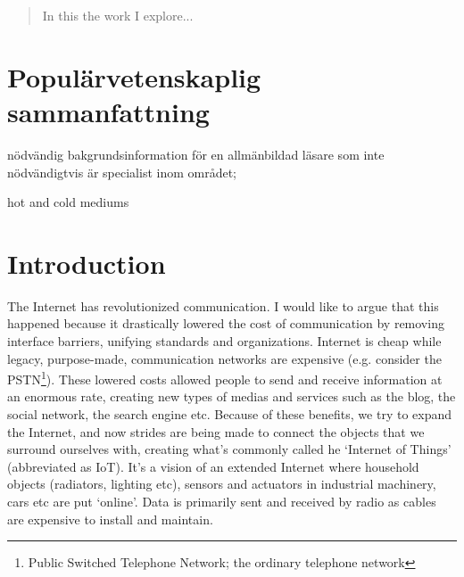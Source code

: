 \documentclass[final,a4paper,twoside,11pt,onecolumn]{report}
\begin{document}
\maketitle

% 
% 

\begin{abstract}
In this the work I explore...
\end{abstract}

\setcounter{tocdepth}{4}
\tableofcontents

\chapter{Populärvetenskaplig sammanfattning}
nödvändig bakgrundsinformation för en allmänbildad läsare som inte nödvändigtvis är specialist inom området;

hot and cold mediums

\chapter{Introduction}
\label{cha:intro}
The Internet has revolutionized communication. I would like to argue that this happened because it drastically lowered the cost of communication by removing interface barriers, unifying standards and organizations. Internet is cheap while legacy, purpose-made, communication networks are expensive (e.g. consider the PSTN\footnote{Public Switched Telephone Network; the ordinary telephone network}). These lowered costs allowed people to send and receive information at an enormous rate, creating new types of medias and services such as the blog, the social network, the search engine etc. Because of these benefits, we try to expand the Internet, and now strides are being made to connect the objects that we surround ourselves with, creating what's commonly called he `Internet of Things' (abbreviated as IoT). It's a vision of an extended Internet where household objects (radiators, lighting etc), sensors and actuators in industrial machinery, cars etc are put `online'. Data is primarily sent and received by radio as cables are expensive to install and maintain.
\end{document}
